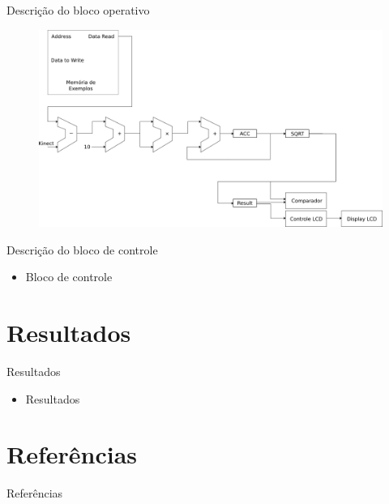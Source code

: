\documentclass[11pt]{beamer}
\begin{document}
\begin{frame}{Descrição do bloco operativo}
	\begin{figure}[ht]
	\centering
	\includegraphics[width=1.0\textwidth]{knn_sem_controle}
	\label{fig:knn_sem_controle}
	\end{figure}
\end{frame}

\begin{frame}{Descrição do bloco de controle}
	\begin{itemize}
	\item Bloco de controle
	\end{itemize}
\end{frame}

\section{Resultados}
\begin{frame}{Resultados}

\begin{itemize}
	\item Resultados
\end{itemize}

\end{frame}

\section{Referências}
\begin{frame}{Referências}
  
	{}
	

\end{frame}
\end{document}
